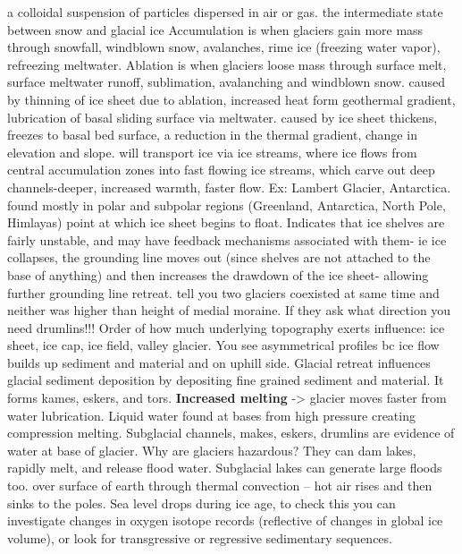 	 a colloidal suspension of particles dispersed in air or gas.
	 the intermediate state between snow and glacial ice
	 Accumulation is when glaciers gain more mass through snowfall, windblown snow, avalanches, rime ice (freezing water vapor), refreezing meltwater.
	 Ablation is when glaciers loose mass through surface melt, surface meltwater runoff, sublimation, avalanching and windblown snow.
	  caused by thinning of ice sheet due to ablation, increased heat form geothermal gradient, lubrication of basal sliding surface via meltwater. 
	 caused by ice sheet thickens, freezes to basal bed surface, a reduction in the thermal gradient, change in elevation and slope. 
	 will transport ice via ice streams, where ice flows from central accumulation zones into fast flowing ice streams, which carve out deep channels-deeper, increased warmth, faster flow. Ex: Lambert Glacier, Antarctica.
	 found mostly in polar and subpolar regions (Greenland, Antarctica, North Pole, Himlayas) 
	 point at which ice sheet begins to float. 
	 Indicates that ice shelves are fairly unstable, and may have feedback mechanisms associated with them- ie ice collapses, the grounding line moves out (since shelves are not attached to the base of anything) and then increases the drawdown of the ice sheet- allowing further grounding line retreat.
	 tell you two glaciers coexisted at same time and neither was higher than height of medial moraine. If they ask what direction you need drumlins!!! Order of how much underlying topography exerts influence: ice sheet, ice cap, ice field, valley glacier. You see asymmetrical profiles bc ice flow builds up sediment and material and on uphill side. Glacial retreat influences glacial sediment deposition by depositing fine grained sediment and material. It forms kames, eskers, and tors. \ddd \textbf{Increased melting} -> glacier moves faster from water lubrication. Liquid water found at bases from high pressure creating compression melting. Subglacial channels, makes, eskers, drumlins are evidence of water at base of glacier. Why are glaciers hazardous? They can dam lakes, rapidly melt, and release flood water. Subglacial lakes can generate large floods too.
	 over surface of earth through thermal convection – hot air rises and then sinks to the poles. Sea level drops during ice age, to check this you can investigate changes in oxygen isotope records (reflective of changes in global ice volume), or look for transgressive or regressive sedimentary sequences. \
